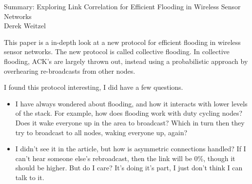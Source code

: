 \documentclass[12pt]{article}
\begin{document}
\begin{center}
{\huge Summary: Exploring Link Correlation for Efficient Flooding in Wireless Sensor Networks } \\
Derek Weitzel
\end{center}

This paper is a in-depth look at a new protocol for efficient flooding in wireless sensor networks.  The new protocol is called collective flooding.  In collective flooding, ACK's are largely thrown out, instead using a probabilistic approach by overhearing re-broadcasts from other nodes.

I found this protocol interesting, I did have a few questions.  

\begin{itemize}
\item I have always wondered about flooding, and how it interacts with lower levels of the stack.  For example, how does flooding work with duty cycling nodes?  Does it wake everyone up in the area to broadcast?  Which in turn then they try to broadcast to all nodes, waking everyone up, again?

\item I didn't see it in the article, but how is asymmetric connections handled?  If I can't hear someone else's rebroadcast, then the link will be 0\%, though it should be higher.  But do I care?  It's doing it's part, I just don't think I can talk to it.  

\end{itemize}
\end{document}
